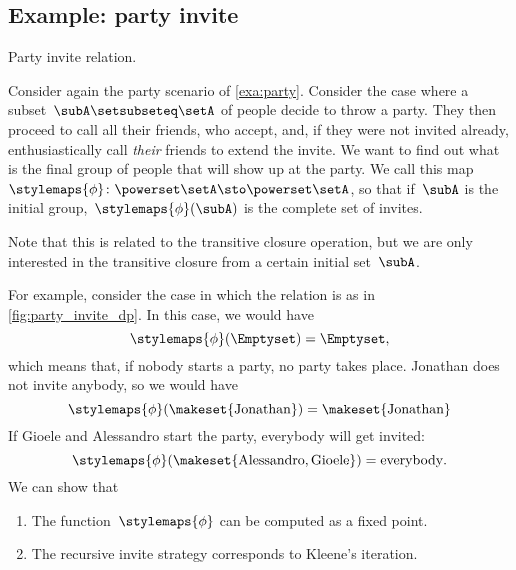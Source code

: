\subsection{Example: party invite}

\begin{marginfigure}
    \caption{Party invite relation.}
    \label{fig:party_invite_dp}
\end{marginfigure}

Consider again the party scenario of \cref{exa:party}.
Consider the case where a subset~$\subA \setsubseteq \setA$ of people decide to throw a party.
They then proceed to call all their friends, who accept, and,
if they were not invited already, enthusiastically call \emph{their} friends to extend the invite.
We want to find out what is the final group of people that will show up at the party.
We call this map~$\stylemaps{\phi} \colon \powerset \setA \sto \powerset \setA$, so that if~$\subA$ is the initial group,~$\stylemaps{\phi}(\subA)$ is the complete set of invites.

Note that this is related to the transitive closure operation, but we are only interested in the transitive closure from a certain initial set~$\subA$.

For example, consider the case in which the relation is as in \cref{fig:party_invite_dp}.
In this case, we would have
\begin{equation}
    \stylemaps{\phi}(\Emptyset) = \Emptyset,
\end{equation}
which means that, if nobody starts a party, no party takes place.
Jonathan does not invite anybody, so we would have
\begin{equation}
    \stylemaps{\phi}(\makeset{\text{Jonathan}}) = \makeset{\text{Jonathan}}
\end{equation}
If Gioele and Alessandro start the party, everybody will get invited:
\begin{equation}
    \stylemaps{\phi}(\makeset{\text{Alessandro}, \text{Gioele}}) = \text{everybody}.
\end{equation}
%
We can show that
\begin{enumerate}
    \item The function~$\stylemaps{\phi}$ can be computed as a fixed point.
    \item The recursive invite strategy corresponds to Kleene's iteration.
\end{enumerate}

